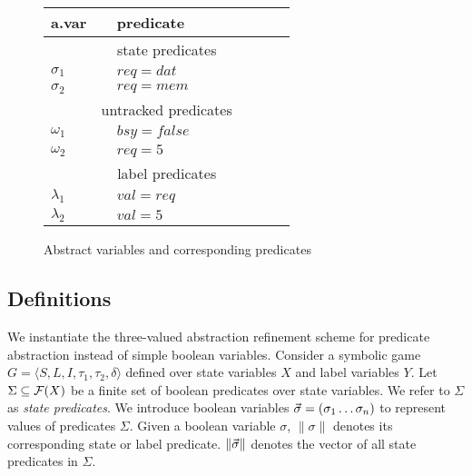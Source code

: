 \begin{figure}
    \label{fig:ex_game_abstraction}
    \caption{Abstract variables and corresponding predicates}
    \begin{tabular}{|p{0.14\linewidth}|p{0.5\linewidth}|}
        \hline
        {\bf a.var} & {\bf predicate} \\
        \hline\hline
        \multicolumn{2}{|c|}{state predicates} \\
        \hline
        $\sigma_1$ & $req=dat$   \\
        $\sigma_2$ & $req=mem$   \\
        \hline\hline
        \multicolumn{2}{|c|}{untracked predicates} \\
        \hline
        $\omega_1$ & $bsy=false$ \\
        $\omega_2$ & $req=5$     \\
        \hline\hline
        \multicolumn{2}{|c|}{label predicates} \\
        \hline
        $\lambda_1$ & $val=req$  \\
        $\lambda_2$ & $val=5$    \\
        \hline
    \end{tabular}
\end{figure}

\subsection{Definitions}

We instantiate the three-valued abstraction refinement scheme for predicate abstraction instead of simple boolean variables. Consider a symbolic game $G = \langle S, L, I, \tau_1, \tau_2, \delta \rangle$ defined over state variables $X$ and label variables $Y$. Let $\Sigma\subseteq\mathcal{F}(X)$ be a finite set of boolean predicates over state variables. We refer to $\Sigma$ as \emph{state predicates}. We introduce boolean variables $\vec{\sigma}=(\sigma_1\ldots\sigma_n)$ to represent values of predicates $\Sigma$. Given a boolean variable $\sigma$, $\|\sigma\|$ denotes its corresponding state or label predicate. $\|\vec{\sigma}\|$ denotes the vector of all state predicates in $\Sigma$.


